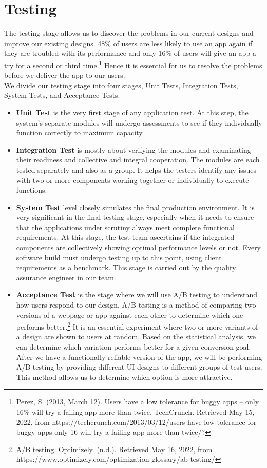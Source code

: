 \section{Testing}
\label{ch2test}
The testing stage allows us to discover the problems in our current designs and improve our existing designs. 
48\% of users are less likely to use an app again if they are troubled with its performance and only 16\% of users will give an app a try for a second or third time.\footnote{Perez, S. (2013, March 12). Users have a low tolerance for buggy apps – only 16\% will try a failing app more than twice. TechCrunch. Retrieved May 15, 2022, from https://techcrunch.com/2013/03/12/users-have-low-tolerance-for-buggy-apps-only-16-will-try-a-failing-app-more-than-twice/?} Hence it is essential for us to resolve the problems before we deliver the app to our users.
\\We divide our testing stage into four stages, Unit Tests, Integration Tests, System Tests, and Acceptance Tests.
\begin{itemize}
\item\textbf{Unit Test} is the very first stage of any application test. At this step, the system’s separate modules will undergo assessments to see if they individually function correctly to maximum capacity. 
\item\textbf{Integration Test} is mostly about verifying the modules and examinating their readiness and collective and integral cooperation. The modules are each tested separately and also as a group. It helps the testers identify any issues with two or more components working together or individually to execute functions.
\item\textbf{System Test} level closely simulates the final production environment. It is very significant in the final testing stage, especially when it needs to ensure that the applications under scrutiny always meet complete functional requirements. 
At this stage, the test team ascertains if the integrated components are collectively showing optimal performance levels or not. Every software build must undergo testing up to this point, using client requirements as a benchmark. This stage is carried out by the quality assurance engineer in our team.
\item\textbf{Acceptance Test} is the stage where we will use A/B testing to understand how users respond to our design. 
A/B testing is a method of comparing two versions of a webpage or app against each other to determine which one performs better.\footnote{A/B testing. Optimizely. (n.d.). Retrieved May 16, 2022, from https://www.optimizely.com/optimization-glossary/ab-testing/} It is an essential experiment where two or more variants of a design are shown to users at random. Based on the statistical analysis, we can determine which variation performs better for a given conversion goal.
After we have a functionally-reliable version of the app, 
we will be performing A/B testing by providing different UI designs to different groups of test users. This method allows us to 
determine which option is more attractive.\end{itemize}

